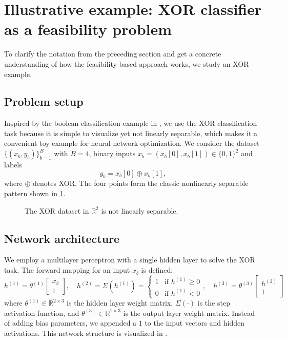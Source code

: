 \section{Illustrative example: XOR classifier as a feasibility problem}
\label{sec:feas}
To clarify the notation from the preceding section and get a concrete understanding of how the feasibility-based approach works, we study an XOR example.
\subsection{Problem setup}
Inspired by the boolean classification example in \cite{elser2019learning}, we use the
XOR classification task because it is simple to visualize yet not linearly separable,
which makes it a convenient toy example for neural network optimization. We consider the dataset $\{(x_b, y_b)\}_{b=1}^B$ with $B=4$, binary inputs
$x_b = (x_b[0], x_b[1]) \in \{0,1\}^2$ and labels
\begin{equation*}
y_b = x_b[0] \oplus x_b[1],
\end{equation*}
where $\oplus$ denotes XOR. The four
points form the classic nonlinearly separable pattern shown in
\cref{fig:xor-problem}.

\begin{figure}[ht]
\centering

\caption{The XOR dataset in $\mathbb{R}^2$ is not linearly separable.}
\label{fig:xor-problem}
\end{figure}
\subsection{Network architecture}
We employ a multilayer perceptron with a single hidden layer to solve the XOR task. The forward mapping for an input $x_b$ is defined:
\[
     h^{(1)} = \theta^{(1)} \begin{bmatrix} x_b \\ 1 \end{bmatrix}, \quad  h^{(2)} = \Sigma(h^{(1)}) = \begin{cases} 1 & \text{if } h^{(1)} \geq 0 \\ 0 & \text{if } h^{(1)} < 0 \end{cases}, \quad  h^{(3)} = \theta^{(3)} \begin{bmatrix} h^{(2)} \\ 1 \end{bmatrix}
\]
where $\theta^{(1)} \in \mathbb{R}^{2 \times 3}$ is the hidden layer weight matrix, $\Sigma(\cdot)$ is the step activation function, and $\theta^{(3)} \in \mathbb{R}^{1 \times 3}$ is the output layer weight matrix. Instead of adding bias parameters, we appended a $1$ to the input vectors and hidden activations. This network structure is visualized in .

